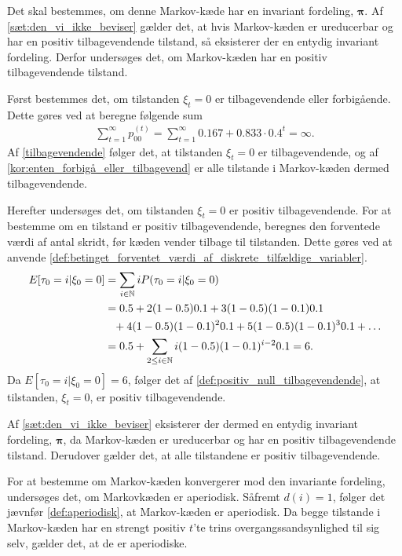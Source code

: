 Det skal bestemmes, om denne Markov-kæde har en invariant fordeling, $\bm \pi$. Af \autoref{sæt:den_vi_ikke_beviser} gælder det, at hvis Markov-kæden er ureducerbar og har en positiv tilbagevendende tilstand, så eksisterer der en entydig invariant fordeling. Derfor undersøges det, om Markov-kæden har en positiv tilbagevendende tilstand. 

Først bestemmes det, om tilstanden $\xi_t = 0$ er tilbagevendende eller forbigående. Dette gøres ved at beregne følgende sum
\begin{align*}
    \sum_{t=1}^\infty p_{00}^{(t)} = \sum_{t=1}^\infty 0.167+0.833\cdot 0.4^t = \infty.
\end{align*}
Af \autoref{tilbagevendende} følger det, at tilstanden $\xi_t = 0$ er tilbagevendende, og af
\autoref{kor:enten_forbigå_eller_tilbagevend} er alle tilstande i Markov-kæden dermed tilbagevendende.

Herefter undersøges det, om tilstanden $\xi_t = 0$ er positiv tilbagevendende. For at bestemme om en tilstand er positiv tilbagevendende, beregnes den forventede værdi af antal skridt, før kæden vender tilbage til tilstanden. Dette gøres ved at anvende \autoref{def:betinget_forventet_værdi_af_diskrete_tilfældige_variabler}.
 \begin{align*}
     E[\tau_{0}=i|\xi_0=0]&=\sum_{i\in \mathbb{N}} iP(\tau_{0}=i|\xi_0=0)\\
     &=0.5+2(1-0.5)0.1+3(1-0.5)(1-0.1)0.1\\
     &\phantom{=} +4(1-0.5)(1-0.1)^20.1+5(1-0.5)(1-0.1)^30.1+\ldots\\
     &=0.5 + \sum_{2\leq i \in \mathbb{N} } i(1-0.5)(1-0.1)^{i-2}0.1 = 6.
 \end{align*}
Da $E[\tau_{0}=i|\xi_0=0]=6$, følger det af \autoref{def:positiv_null_tilbagevendende}, at tilstanden, $\xi_t = 0$, er positiv tilbagevendende.

Af \autoref{sæt:den_vi_ikke_beviser} eksisterer der dermed en entydig invariant fordeling, $\bm \pi$, da Markov-kæden er ureducerbar og har en positiv tilbagevendende tilstand. Derudover gælder det, at alle tilstandene er positiv tilbagevendende.


For at bestemme om Markov-kæden konvergerer mod den invariante fordeling, undersøges det, om Markovkæden er aperiodisk. Såfremt $d(i)=1$, følger det jævnfør \autoref{def:aperiodisk}, at Markov-kæden er aperiodisk. Da begge tilstande i Markov-kæden har en strengt positiv $t$'te trins overgangssandsynlighed til sig selv, gælder det, at de er aperiodiske. 


